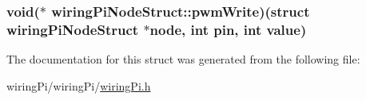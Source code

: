 \hypertarget{structwiringPiNodeStruct_af8e3c325938bb0d691a9751b4c410d8c}{
\subsubsection[{pwm\-Write}]{\setlength{\rightskip}{0pt plus 5cm}void($\ast$ wiring\-Pi\-Node\-Struct\-::pwm\-Write)(struct {\bf wiring\-Pi\-Node\-Struct} $\ast$node, int pin, int value)}}\label{structwiringPiNodeStruct_af8e3c325938bb0d691a9751b4c410d8c}


The documentation for this struct was generated from the following file\-:\begin{DoxyCompactItemize}
\item 
wiring\-Pi/wiring\-Pi/\hyperlink{wiringPi_8h}{wiring\-Pi.\-h}\end{DoxyCompactItemize}
